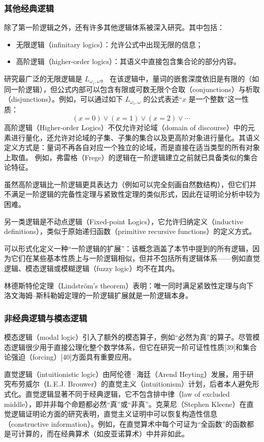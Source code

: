\subsubsection{其他经典逻辑}
除了第一阶逻辑之外，还有许多其他逻辑体系被深入研究。其中包括：
\begin{itemize}
  \item 无限逻辑（infinitary logics）：允许公式中出现无限的信息；
  \item 高阶逻辑（higher-order logics）：其语义中直接包含集合论的部分内容。
\end{itemize}
研究最广泛的无限逻辑是 \( L_{\omega_{1}, \omega} \)。  在该逻辑中，量词的嵌套深度依旧是有限的（如同一阶逻辑），但公式内部可以包含有限或可数无限个合取（conjunctions）与析取（disjunctions）。例如，可以通过如下 \( L_{\omega_{1}, \omega} \) 的公式表述“\(x\) 是一个整数”这一性质：
\[
(x = 0) \lor (x = 1) \lor (x = 2) \lor \cdots~
\]
高阶逻辑（Higher-order Logics）不仅允许对论域（domain of discourse）中的元素进行量化，还允许对论域的子集、子集的集合以及更高阶对象进行量化。其语义定义方式是：量词不再各自对应一个独立的论域，而是直接在适当类型的所有对象上取值。 例如，弗雷格（Frege）的逻辑在一阶逻辑建立之前就已具备类似的集合论特征。

虽然高阶逻辑比一阶逻辑更具表达力（例如可以完全刻画自然数结构），但它们并不满足一阶逻辑的完备性定理与紧致性定理的类似形式，因此在证明论分析中较为困难。


另一类逻辑是不动点逻辑（Fixed-point Logics），它允许归纳定义（inductive definitions），类似于原始递归函数（primitive recursive functions）的定义方式。

可以形式化定义一种“一阶逻辑的扩展”：该概念涵盖了本节中提到的所有逻辑，因为它们在某些基本性质上与一阶逻辑相似，但并不包括所有逻辑体系——例如直觉逻辑、模态逻辑或模糊逻辑（fuzzy logic）均不在其内。

林德斯特伦定理（Lindström's theorem）表明：唯一同时满足紧致性定理与向下洛文海姆–斯科勒姆定理的一阶逻辑扩展就是一阶逻辑本身。
\subsubsection{非经典逻辑与模态逻辑}
模态逻辑（modal logic）引入了额外的模态算子，例如“必然为真”的算子。尽管模态逻辑很少用于直接公理化整个数学体系，但它在研究一阶可证性性质[39]和集合论强迫（forcing）[40]方面具有重要应用。

直觉逻辑（intuitionistic logic）由阿伦德·海廷（Arend Heyting）发展，用于研究布劳威尔（L.E.J. Brouwer）的直觉主义（intuitionism）计划，后者本人避免形式化。直觉逻辑显著不同于经典逻辑，它不包含排中律（law of excluded middle），即并非每个命题都必然“真”或“非真”。克莱尼（Stephen Kleene）在直觉逻辑证明论方面的研究表明，直觉主义证明中可以恢复构造性信息（constructive information）。例如，在直觉算术中每个可证为“全函数”的函数都是可计算的，而在经典算术（如皮亚诺算术）中并非如此。
